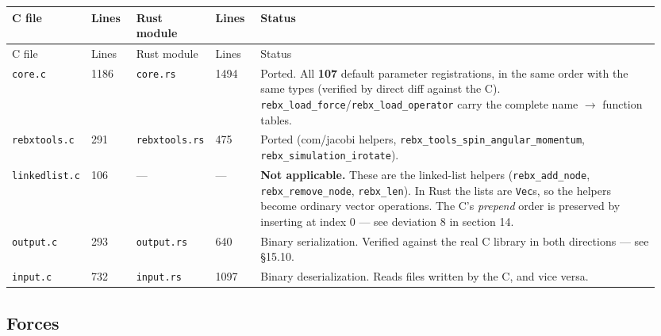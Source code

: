 \documentclass[11pt]{article}
\begin{document}
\begin{longtable}{L{0.077\linewidth}L{0.077\linewidth}L{0.077\linewidth}L{0.077\linewidth}L{0.641\linewidth}}
\toprule
C file & Lines & Rust module & Lines & Status \\
\midrule
\endfirsthead
\toprule
C file & Lines & Rust module & Lines & Status \\
\midrule
\endhead
\texttt{core.c} & 1186 & \texttt{core.rs} & 1494 & Ported. All \textbf{107} default parameter registrations, in the same order with the same types (verified by direct diff against the C). \texttt{rebx\_load\_force}/\texttt{rebx\_load\_operator} carry the complete name \(\rightarrow\) function tables. \\
\texttt{rebxtools.c} & 291 & \texttt{rebxtools.rs} & 475 & Ported (com/jacobi helpers, \texttt{rebx\_tools\_spin\_angular\_momentum}, \texttt{rebx\_simulation\_irotate}). \\
\texttt{linkedlist.c} & 106 & --- & --- & \textbf{Not applicable.} These are the linked-list helpers (\texttt{rebx\_add\_node}, \texttt{rebx\_remove\_node}, \texttt{rebx\_len}). In Rust the lists are \texttt{Vec}s, so the helpers become ordinary vector operations. The C's \emph{prepend} order is preserved by inserting at index 0 --- see deviation 8 in section 14. \\
\texttt{output.c} & 293 & \texttt{output.rs} & 640 & Binary serialization. Verified against the real C library in both directions --- see \S{}15.10. \\
\texttt{input.c} & 732 & \texttt{input.rs} & 1097 & Binary deserialization. Reads files written by the C, and vice versa. \\
\bottomrule
\end{longtable}

\subsection{Forces}
\end{document}
